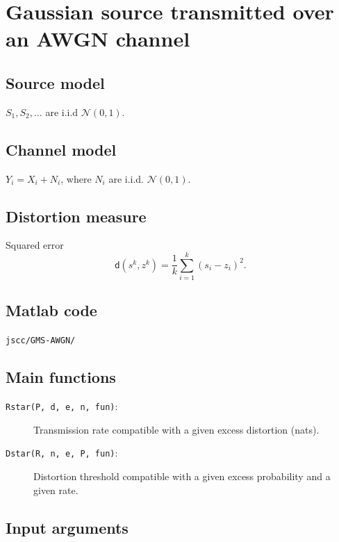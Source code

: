 \documentclass[a4paper,11p]{memoir}
\begin{document}
\section{Gaussian source transmitted over an AWGN channel}

\subsection{Source model}
$ S_1, S_2, \ldots $ are i.i.d $\mathcal N(0, 1)$. 


\subsection{Channel model}
$Y_i = X_i + N_i$, where $N_i$ are i.i.d. $\mathcal N(0, 1)$. 


\subsection{Distortion measure}
Squared error $$\mathsf d(s^k, z^k) = \frac 1 k \sum_{i = 1}^k (s_i - z_i)^2.$$

\subsection{Matlab code}
 \verb|jscc/GMS-AWGN/|


\subsection{Main functions}
\begin{description}
\item[\texttt{Rstar(P, d, e, n, fun)}:]  Transmission rate compatible with a given excess distortion (nats). 
\item[\texttt{Dstar(R, n, e, P, fun)}:]  Distortion threshold compatible with a given excess probability and a given rate. 
\end{description}

\subsection{Input arguments}
\end{document}
